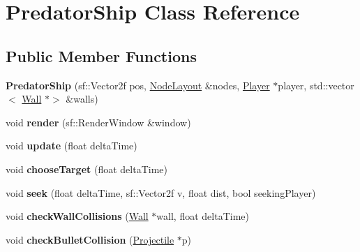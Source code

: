 \hypertarget{class_predator_ship}{}\section{Predator\+Ship Class Reference}
\label{class_predator_ship}
\subsection*{Public Member Functions}
\begin{DoxyCompactItemize}
\item 
\mbox{\label{class_predator_ship_a4af0d2cfa90c67811bc8cd0e3cb26e58}} 
{\bfseries Predator\+Ship} (sf\+::\+Vector2f pos, \mbox{\hyperlink{class_node_layout}{Node\+Layout}} \&nodes, \mbox{\hyperlink{class_player}{Player}} $\ast$player, std\+::vector$<$ \mbox{\hyperlink{class_wall}{Wall}} $\ast$$>$ \&walls)
\item 
\mbox{\label{class_predator_ship_abd172d5ef1713de0e79e33ce7b23c13a}} 
void {\bfseries render} (sf\+::\+Render\+Window \&window)
\item 
\mbox{\label{class_predator_ship_aaecc92f60ecbaaaf2f41edbe15a458ea}} 
void {\bfseries update} (float delta\+Time)
\item 
\mbox{\label{class_predator_ship_a5143808a096196286fa4b3c546c183ce}} 
void {\bfseries choose\+Target} (float delta\+Time)
\item 
\mbox{\label{class_predator_ship_a941925b4c228dcbb9fae0d8f9ee8af24}} 
void {\bfseries seek} (float delta\+Time, sf\+::\+Vector2f v, float dist, bool seeking\+Player)
\item 
\mbox{\label{class_predator_ship_aa7763a0a0b525421f672ef3e05c1b9ea}} 
void {\bfseries check\+Wall\+Collisions} (\mbox{\hyperlink{class_wall}{Wall}} $\ast$wall, float delta\+Time)
\item 
\mbox{\label{class_predator_ship_a5b3c56caa2c17fbe78d377c0b4ad5408}} 
void {\bfseries check\+Bullet\+Collision} (\mbox{\hyperlink{class_projectile}{Projectile}} $\ast$p)
\item 
\mbox{\label{class_predator_ship_a68003be2e0126853481903bccb5473ed}} 
$$
\end{DoxyCompactItemize}
